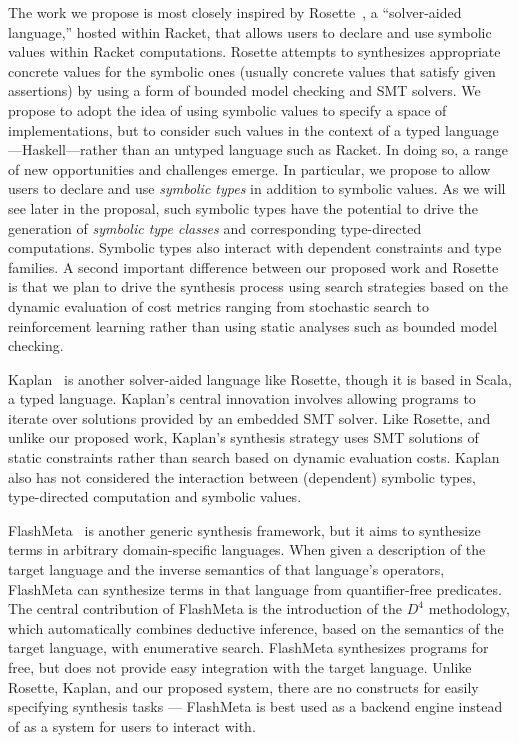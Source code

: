 The work we propose is most closely inspired by
Rosette~\cite{Torlak:rosette-onward,Torlak:rosette-pldi}, a
``solver-aided language,'' hosted within Racket, that allows users to
declare and use symbolic values within Racket computations.  Rosette
attempts to synthesizes appropriate concrete values for the symbolic
ones (usually concrete values that satisfy given assertions) by using
a form of bounded model checking and SMT solvers.  We propose to adopt
the idea of using symbolic values to specify a space of
implementations, but to consider such values in the context of a typed
language---Haskell---rather than an untyped language such as Racket.
In doing so, a range of new opportunities and challenges emerge.  In
particular, we propose to allow users to declare and use
\emph{symbolic types} in addition to symbolic values.  As we will see
later in the proposal, such symbolic types have the potential to drive
the generation of \emph{symbolic type classes} and corresponding
type-directed computations.  Symbolic types also interact with
dependent constraints and type families.  A second important
difference between our proposed work and Rosette is that we plan to
drive the synthesis process 
using search strategies based on the dynamic evaluation of cost metrics
ranging from stochastic search to reinforcement learning rather than using
static analyses such as bounded model checking.

Kaplan~\cite{kaplan} is another solver-aided language like Rosette,
though it is based in Scala, a typed language.  Kaplan's central
innovation involves allowing programs to iterate over solutions
provided by an embedded SMT solver.  Like Rosette, and unlike our
proposed work, Kaplan's synthesis strategy uses SMT solutions
of static constraints rather than search based on dynamic evaluation
costs.  Kaplan also has not considered the interaction between (dependent) 
symbolic types, type-directed computation and symbolic values.

FlashMeta~\cite{Polozov:Flashmeta} is another generic synthesis
framework, but it aims to synthesize terms in arbitrary
domain-specific languages.  When given a description of the target
language and the inverse semantics of that language's operators,
FlashMeta can synthesize terms in that language from quantifier-free
predicates.  The central contribution of FlashMeta is the introduction
of the $D^4$ methodology, which automatically combines deductive
inference, based on the semantics of the target language, with
enumerative search.  FlashMeta synthesizes programs for free, but does
not provide easy integration with the target language.  Unlike
Rosette, Kaplan, and our proposed system, there are no constructs for
easily specifying synthesis tasks --- FlashMeta is best used as a
backend engine instead of as a system for users to interact with.

